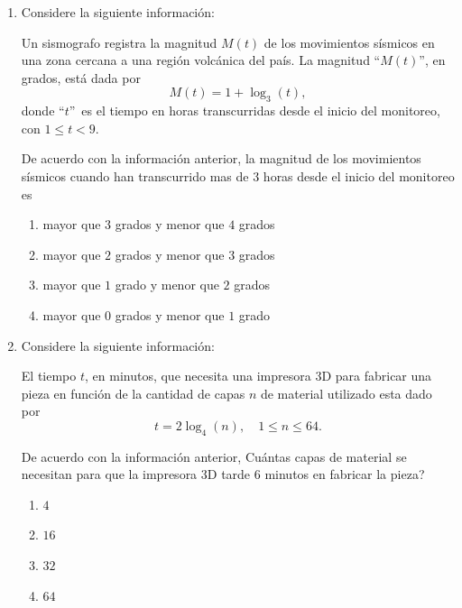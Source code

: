 \documentclass[12pt]{article}
\begin{document}
\begin{enumerate}[label=\textbf{\arabic*.}, itemsep=2.5cm]
De acuerdo con la informaci\'on anterior, \textquestiondown Cu\'al representaci\'on algebraica corresponde a la funci\'on $h$?

\begin{enumerate}[label=\Alph*)]
  \item $h(x)=2\sqrt{x-1}+3$
  \item $h(x)=2\sqrt{x+1}+3$
  \item $h(x)=2\sqrt{x-1}-3$
  \item $h(x)=\sqrt{x-1}+3$
\end{enumerate}

\Needspace{0.45\textheight}
\item
Considere la siguiente informaci\'on:

Un sismografo registra la magnitud $M(t)$ de los movimientos s\'ismicos en una zona cercana a una regi\'on volc\'anica del pa\'is. La magnitud \textquotedblleft$M(t)$\textquotedblright, en grados, est\'a dada por
\[
M(t) = 1 + \log_3(t),
\]
donde \textquotedblleft$t$\textquotedblright\ es el tiempo en horas transcurridas desde el inicio del monitoreo, con $1 \leq t < 9$.

De acuerdo con la informaci\'on anterior, la magnitud de los movimientos s\'ismicos cuando han transcurrido mas de $3$ horas desde el inicio del monitoreo es

\begin{enumerate}[label=\Alph*)]
  \item mayor que $3$ grados y menor que $4$ grados
  \item mayor que $2$ grados y menor que $3$ grados
  \item mayor que $1$ grado y menor que $2$ grados
  \item mayor que $0$ grados y menor que $1$ grado
\end{enumerate}

\Needspace{0.42\textheight}
\item
Considere la siguiente informaci\'on:

El tiempo $t$, en minutos, que necesita una impresora 3D para fabricar una pieza en funci\'on de la cantidad de capas $n$ de material utilizado esta dado por
\[
t = 2\log_4(n), \quad 1 \leq n \leq 64.
\]

De acuerdo con la informaci\'on anterior, \textquestiondown Cu\'antas capas de material se necesitan para que la impresora 3D tarde $6$ minutos en fabricar la pieza?

\begin{enumerate}[label=\Alph*)]
  \item $4$
  \item $16$
  \item $32$
  \item $64$
\end{enumerate}


\end{enumerate}
\end{document}
